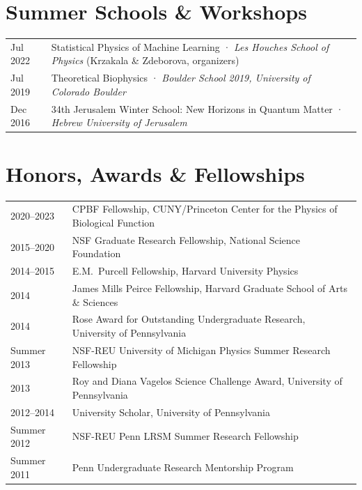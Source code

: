 \documentclass[11pt, letterpaper]{article}
\begin{document}
\section{Summer Schools \& Workshops}

\begin{tabularx}{\linewidth}{@{}lX@{}}
  \textcolor{midgray}{Jul 2022} &
    Statistical Physics of Machine Learning
    · \textit{Les Houches School of Physics} (Krzakala \& Zdeborova, organizers) \\[3pt]
  \textcolor{midgray}{Jul 2019} &
    Theoretical Biophysics
    · \textit{Boulder School 2019, University of Colorado Boulder} \\[3pt]
  \textcolor{midgray}{Dec 2016} &
    34th Jerusalem Winter School: New Horizons in Quantum Matter
    · \textit{Hebrew University of Jerusalem} \\
\end{tabularx}

\section{Honors, Awards \& Fellowships}

\begin{tabularx}{\linewidth}{@{}lX@{}}
  \textcolor{midgray}{2020–2023} &
    CPBF Fellowship, CUNY/Princeton Center for the Physics of Biological Function \\[3pt]
  \textcolor{midgray}{2015–2020} &
    NSF Graduate Research Fellowship, National Science Foundation \\[3pt]
  \textcolor{midgray}{2014–2015} &
    E.M.\ Purcell Fellowship, Harvard University Physics \\[3pt]
  \textcolor{midgray}{2014} &
    James Mills Peirce Fellowship, Harvard Graduate School of Arts \& Sciences \\[3pt]
  \textcolor{midgray}{2014} &
    Rose Award for Outstanding Undergraduate Research, University of Pennsylvania \\[3pt]
    \textcolor{midgray}{Summer 2013} &
    NSF-REU University of Michigan Physics Summer Research Fellowship \\[3pt]
  \textcolor{midgray}{2013} &
    Roy and Diana Vagelos Science Challenge Award, University of Pennsylvania \\[3pt]
  \textcolor{midgray}{2012–2014} &
    University Scholar, University of Pennsylvania \\
    \textcolor{midgray}{Summer 2012} &
    NSF-REU Penn LRSM Summer Research Fellowship \\[3pt]
    \textcolor{midgray}{Summer 2011} &
    Penn Undergraduate Research Mentorship Program \\[3pt]
\end{tabularx}
\end{document}
